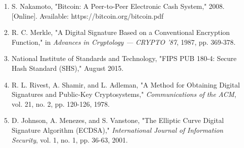 \documentclass[12pt,a4paper]{article}
\begin{document}
\begin{enumerate}
    \item S. Nakamoto, "Bitcoin: A Peer-to-Peer Electronic Cash System," 2008. [Online]. Available: https://bitcoin.org/bitcoin.pdf
    
    \item R. C. Merkle, "A Digital Signature Based on a Conventional Encryption Function," in \textit{Advances in Cryptology — CRYPTO '87}, 1987, pp. 369-378.
    
    \item National Institute of Standards and Technology, "FIPS PUB 180-4: Secure Hash Standard (SHS)," August 2015.
    
    \item R. L. Rivest, A. Shamir, and L. Adleman, "A Method for Obtaining Digital Signatures and Public-Key Cryptosystems," \textit{Communications of the ACM}, vol. 21, no. 2, pp. 120-126, 1978.
    
    \item D. Johnson, A. Menezes, and S. Vanstone, "The Elliptic Curve Digital Signature Algorithm (ECDSA)," \textit{International Journal of Information Security}, vol. 1, no. 1, pp. 36-63, 2001.
\end{enumerate}
\end{document}

